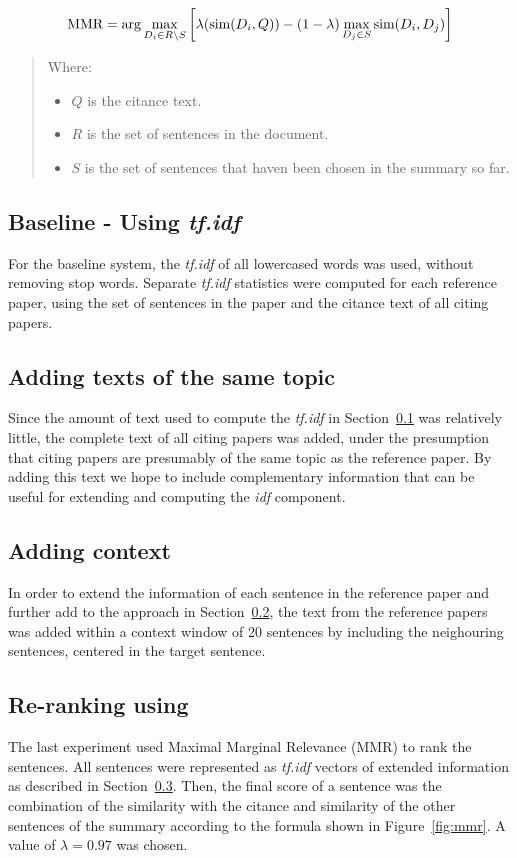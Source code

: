 \documentclass[11pt]{article}
\begin{document}
\begin{figure*}
$$
\hbox{MMR} = \arg\max_{D_i\in R\setminus S}\left[\lambda(\hbox{sim}(D_i,Q)) -
(1-\lambda) \max_{D_j\in S} \hbox{sim}(D_i,D_j)\right]
$$  
\begin{quote}
Where:
\begin{itemize}
\item $Q$ is the citance text.
\item $R$ is the set of sentences in the document.
\item $S$ is the set of sentences that haven been chosen in the
  summary so far.  
\end{itemize}
\end{quote}
  \caption{Maximal Marginal Relevance (MMR)}
  \label{fig:mmr}
\end{figure*}


\subsection{Baseline - Using \emph{tf.idf}}\label{sec:tfidf}
For the baseline system, the \emph{tf.idf} of all lowercased words was used, without removing stop words. Separate
\emph{tf.idf} statistics were computed for each reference paper, using the set of sentences in the paper and the citance text of all citing papers.

\subsection{Adding texts of the same topic}\label{sec:topics}
Since the amount of text used to compute the \emph{tf.idf} in Section~\ref{sec:tfidf} was relatively little, the complete text of all citing papers was added, under the presumption that citing papers are presumably of the same topic as the reference paper. By adding this text we hope to include complementary information that can be useful for extending and computing the \emph{idf} component. 

\subsection{Adding context}\label{sec:context}
In order to  extend the information of each sentence in the reference paper and further add to the approach in Section~\ref{sec:topics}, the text from the reference papers was added within a context window of 20 sentences by including the neighouring sentences, centered in the target sentence.

\subsection{Re-ranking using 
}\label{sec:mmr}
The last experiment used Maximal Marginal Relevance (MMR) \cite{Carbonell:1998} to rank the sentences. All sentences were
represented as \emph{tf.idf} vectors of extended information as described in Section~\ref{sec:context}. Then, the final score of a
sentence was the combination of the similarity with the citance and similarity of the other sentences of the summary according to the formula shown in Figure~\ref{fig:mmr}. A value of $\lambda=0.97$ was chosen.
\end{document}
